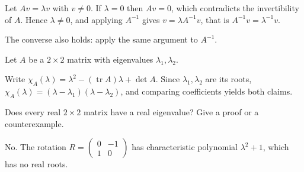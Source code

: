 \documentclass[11pt]{article}
\begin{document}
\begin{solution}
Let $Av=\lambda v$ with $v\neq 0$.  If $\lambda=0$ then $Av=0$, which
contradicts the invertibility of $A$.  Hence $\lambda\neq0$, and applying
$A^{-1}$ gives $v=\lambda A^{-1}v$, that is
$A^{-1}v=\lambda^{-1}v$.

\begin{remark}
The converse also holds: apply the same argument to $A^{-1}$.
\end{remark}
\end{solution}

\begin{question}[title=Trace and determinant, marks=3+3]
Let $A$ be a $2\times2$ matrix with eigenvalues $\lambda_1,\lambda_2$.
\end{question}

\begin{solution}
Write $\chi_A(\lambda)=\lambda^2-(\operatorname{tr}A)\lambda+\det A$.
Since $\lambda_1,\lambda_2$ are its roots,
$\chi_A(\lambda)=(\lambda-\lambda_1)(\lambda-\lambda_2)$, and comparing
coefficients yields both claims.
\end{solution}

\begin{question*}[label=Bonus, marks=2]
Does every real $2\times2$ matrix have a real eigenvalue?  Give a proof
or a counterexample.
\end{question*}

\begin{solution}
No.  The rotation $R=\begin{pmatrix}0&-1\\1&0\end{pmatrix}$ has
characteristic polynomial $\lambda^2+1$, which has no real roots.
\end{solution}
\end{document}
